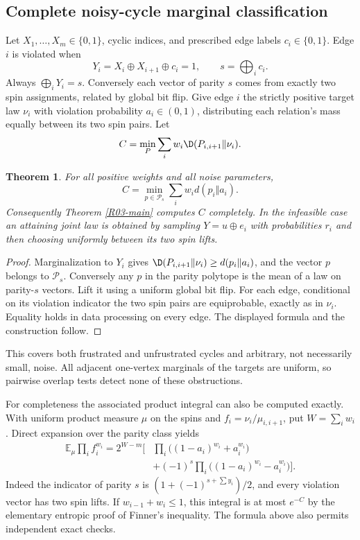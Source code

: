 \documentclass[11pt,a4paper]{article}
\newtheorem{theorem}{Theorem}[section]
\theoremstyle{definition}\newtheorem{definition}[theorem]{Definition}
\theoremstyle{remark}\newtheorem{remark}[theorem]{Remark}
\newcommand{\E}{\mathbb E}\newcommand{\one}{\mathbf 1}\newcommand{\1}{\mathbf 1}
\numberwithin{equation}{section}
\begin{document}
\subsection{Complete noisy-cycle marginal classification}\label{R03-sec-5}
Let $X_1,\ldots,X_m\in\{0,1\}$, cyclic indices, and prescribed edge labels $c_i\in\{0,1\}$. Edge $i$ is violated when
\[
Y_i=X_i\oplus X_{i+1}\oplus c_i=1,
\qquad s=\bigoplus_i c_i.
\]
Always $\bigoplus_iY_i=s$. Conversely each vector of parity $s$ comes from exactly two spin assignments, related by global bit flip.
Give edge $i$ the strictly positive target law $\nu_i$ with violation probability $a_i\in(0,1)$, distributing each relation's mass equally between its two spin pairs. Let
\[
C=\min_P\sum_iw_i\D(P_{i,i+1}\Vert\nu_i).
\]
\begin{theorem}\label{R03-cycle}
For all positive weights and all noise parameters,
\[
C=\min_{p\in\mathcal P_s}\sum_iw_id(p_i\Vert a_i).
\]
Consequently Theorem \ref{R03-main} computes $C$ completely. In the infeasible case an attaining joint law is obtained by sampling $Y=u\oplus e_i$ with probabilities $r_i$ and then choosing uniformly between its two spin lifts.
\end{theorem}
\begin{proof}
Marginalization to $Y_i$ gives $\D(P_{i,i+1}\Vert\nu_i)\geq d(p_i\Vert a_i)$, and the vector $p$ belongs to $\mathcal P_s$. Conversely any $p$ in the parity polytope is the mean of a law on parity-$s$ vectors. Lift it using a uniform global bit flip. For each edge, conditional on its violation indicator the two spin pairs are equiprobable, exactly as in $\nu_i$. Equality holds in data processing on every edge. The displayed formula and the construction follow.
\end{proof}
This covers both frustrated and unfrustrated cycles and arbitrary, not necessarily small, noise. All adjacent one-vertex marginals of the targets are uniform, so pairwise overlap tests detect none of these obstructions.

For completeness the associated product integral can also be computed exactly. With uniform product measure $\mu$ on the spins and $f_i=\nu_i/\mu_{i,i+1}$, put $W=\sum_iw_i$. Direct expansion over the parity class yields
\begin{align*}
\E_\mu\prod_i f_i^{w_i}
=2^{W-m}\bigg[&\prod_i\big((1-a_i)^{w_i}+a_i^{w_i}\big)\\
&+(-1)^s\prod_i\big((1-a_i)^{w_i}-a_i^{w_i}\big)\bigg].
\end{align*}
Indeed the indicator of parity $s$ is $(1+(-1)^{s+\sum y_i})/2$, and every violation vector has two spin lifts. If $w_{i-1}+w_i\leq1$, this integral is at most $e^{-C}$ by the elementary entropic proof of Finner's inequality. The formula above also permits independent exact checks.
\end{document}
